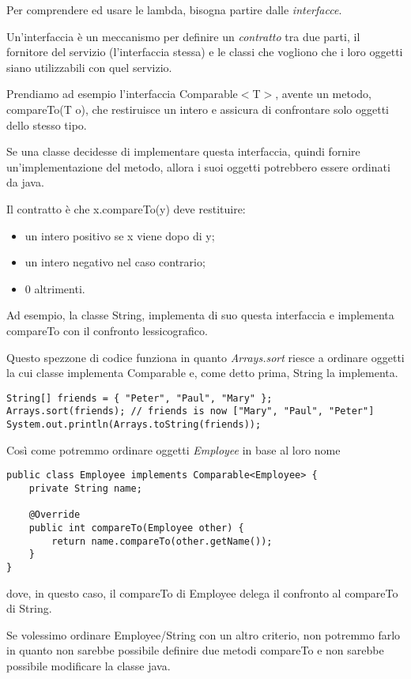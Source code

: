 Per comprendere ed usare le lambda, bisogna partire dalle \textit{interfacce}.

Un'interfaccia è un meccanismo per definire un \textit{contratto} tra due parti, il fornitore del servizio (l'interfaccia stessa) e le classi che vogliono 
che i loro oggetti siano utilizzabili con quel servizio.

Prendiamo ad esempio l'interfaccia Comparable$<$T$>$, avente un metodo, compareTo(T o), che restiruisce un intero e assicura di confrontare solo oggetti dello 
stesso tipo.

Se una classe decidesse di implementare questa interfaccia, quindi fornire un'implementazione del metodo, allora i suoi oggetti potrebbero essere ordinati da 
java.

Il contratto è che x.compareTo(y) deve restituire:
\begin{itemize}
    \item un intero positivo se x viene dopo di y;
    \item un intero negativo nel caso contrario;
    \item 0 altrimenti.
\end{itemize}

Ad esempio, la classe String, implementa di suo questa interfaccia e implementa compareTo con il confronto lessicografico.

Questo spezzone di codice funziona in quanto \textit{Arrays.sort} riesce a ordinare oggetti la cui classe implementa Comparable e, come detto prima, String la 
implementa.
\begin{lstlisting}
String[] friends = { "Peter", "Paul", "Mary" };
Arrays.sort(friends); // friends is now ["Mary", "Paul", "Peter"]
System.out.println(Arrays.toString(friends));
\end{lstlisting}

Così come potremmo ordinare oggetti \textit{Employee} in base al loro nome
\begin{lstlisting}
public class Employee implements Comparable<Employee> {
    private String name;

    @Override
    public int compareTo(Employee other) {
        return name.compareTo(other.getName());
    }
}
\end{lstlisting}
dove, in questo caso, il compareTo di Employee delega il confronto al compareTo di String.

Se volessimo ordinare Employee/String con un altro criterio, non potremmo farlo in quanto non sarebbe possibile definire due metodi compareTo e non sarebbe possibile
modificare la classe java.

